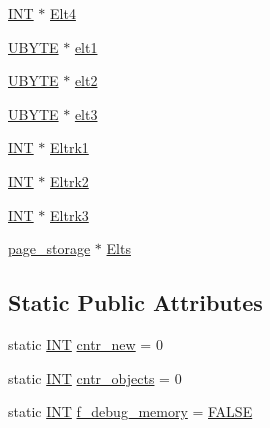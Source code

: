 \begin{DoxyCompactItemize}
\item 
\mbox{\hyperlink{galois_8h_a09fddde158a3a20bd2dcadb609de11dc}{I\+NT}} $\ast$ \mbox{\hyperlink{classperm__group_ae13e702f71728a1877a7999e90ea379a}{Elt4}}
\item 
\mbox{\hyperlink{galois_8h_a122c4acf389c050379f00341fdcd5812}{U\+B\+Y\+TE}} $\ast$ \mbox{\hyperlink{classperm__group_a455e711e3528d6b2e6e669ca0a006cc9}{elt1}}
\item 
\mbox{\hyperlink{galois_8h_a122c4acf389c050379f00341fdcd5812}{U\+B\+Y\+TE}} $\ast$ \mbox{\hyperlink{classperm__group_a5ecd834570a31f7e23a6dfa00ed469cf}{elt2}}
\item 
\mbox{\hyperlink{galois_8h_a122c4acf389c050379f00341fdcd5812}{U\+B\+Y\+TE}} $\ast$ \mbox{\hyperlink{classperm__group_a2568a0c75a01dcfbb9e576b438b310df}{elt3}}
\item 
\mbox{\hyperlink{galois_8h_a09fddde158a3a20bd2dcadb609de11dc}{I\+NT}} $\ast$ \mbox{\hyperlink{classperm__group_a128f4df0f09aa303e62cb85acf2ef785}{Eltrk1}}
\item 
\mbox{\hyperlink{galois_8h_a09fddde158a3a20bd2dcadb609de11dc}{I\+NT}} $\ast$ \mbox{\hyperlink{classperm__group_a73b4c74181fdc71d7487a8ad138b74bd}{Eltrk2}}
\item 
\mbox{\hyperlink{galois_8h_a09fddde158a3a20bd2dcadb609de11dc}{I\+NT}} $\ast$ \mbox{\hyperlink{classperm__group_a709004e9f2c65c728eb709624579bd13}{Eltrk3}}
\item 
\mbox{\hyperlink{classpage__storage}{page\+\_\+storage}} $\ast$ \mbox{\hyperlink{classperm__group_a5ee1c154e8711855684c434cdcf7523b}{Elts}}
\end{DoxyCompactItemize}
\subsection*{Static Public Attributes}
\begin{DoxyCompactItemize}
\item 
static \mbox{\hyperlink{galois_8h_a09fddde158a3a20bd2dcadb609de11dc}{I\+NT}} \mbox{\hyperlink{classperm__group_a143165bc688e1062b578c2334ffa1f61}{cntr\+\_\+new}} = 0
\item 
static \mbox{\hyperlink{galois_8h_a09fddde158a3a20bd2dcadb609de11dc}{I\+NT}} \mbox{\hyperlink{classperm__group_a8503287f98e801f9341bca367fdc72fa}{cntr\+\_\+objects}} = 0
\item 
static \mbox{\hyperlink{galois_8h_a09fddde158a3a20bd2dcadb609de11dc}{I\+NT}} \mbox{\hyperlink{classperm__group_a198bd8fd1b9df11727f2c6ca0fe34ba6}{f\+\_\+debug\+\_\+memory}} = \mbox{\hyperlink{nauty_8h_aa93f0eb578d23995850d61f7d61c55c1}{F\+A\+L\+SE}}
\end{DoxyCompactItemize}


